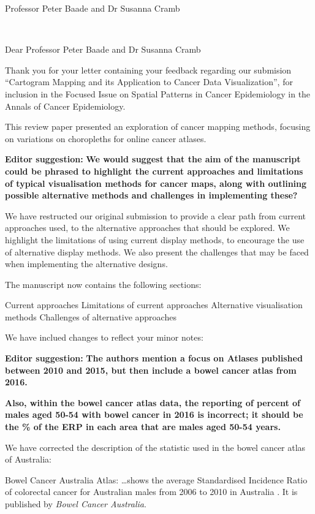 \documentclass[11pt,a4paper,]{letter}
\date{\Date~\Month~\Year}
\makeatletter
\renewcommand*{\opening}[1]{\thispagestyle{monash}%
   {\@date\par}%
  \vspace{2\parskip}%
  {\raggedright \toname \\ \toaddress \par}%
  \vspace{2\parskip}%
  #1\par\nobreak}}
\def\href#1{}
\makeatother
\begin{document}
\begin{letter}{Professor Peter Baade and Dr Susanna Cramb\\}
\vspace*{2cm}
\opening{Dear Professor Peter Baade and Dr Susanna Cramb}
Thank you for your letter containing your feedback regarding our submision ``Cartogram Mapping and its Application to Cancer Data Visualization'', for inclusion in the Focused Issue on Spatial Patterns in Cancer Epidemiology in the Annals of Cancer Epidemiology.

This review paper presented an exploration of cancer mapping methods, focusing on variations on choropleths for online cancer atlases.

\textbf{Editor suggestion:}
\textbf{We would suggest that the aim of the manuscript could be phrased to highlight the current approaches and limitations of typical visualisation methods for cancer maps, along with outlining possible alternative methods and challenges in implementing these?}

We have restructed our original submission to provide a clear path from current approaches used, to the alternative approaches that should be explored. We highlight the limitations of using current display methods, to encourage the use of alternative display methods. We also present the challenges that may be faced when implementing the alternative designs.

The manuscript now contains the following sections:

Current approaches
Limitations of current approaches
Alternative visualisation methods
Challenges of alternative approaches

We have inclued changes to reflect your minor notes:

\textbf{Editor suggestion:}
\textbf{The authors mention a focus on Atlases published between 2010 and 2015, but then include a bowel cancer atlas from 2016. }

\textbf{Also, within the bowel cancer atlas data, the reporting of percent of males aged 50-54 with bowel cancer in 2016 is incorrect; it should be the \% of the ERP in each area that are males aged 50-54 years. }

We have corrected the description of the statistic used in the bowel cancer atlas of Australia:

Bowel Cancer Australia Atlas:
\ldots{}shows the average Standardised Incidence Ratio of colorectal cancer for Australian males from 2006 to 2010 in Australia . It is published by \emph{\href{https://www.bowelcanceraustralia.org/}{Bowel Cancer Australia}}.


\end{letter}
\end{document}
